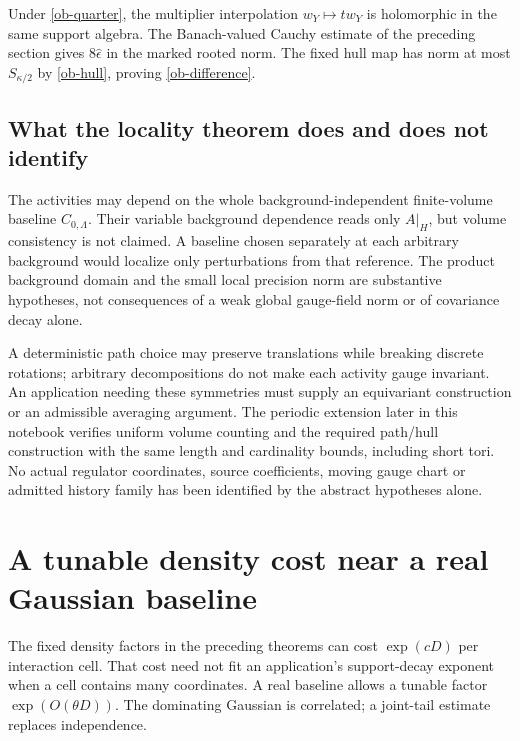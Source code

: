 \documentclass[11pt]{article}
\theoremstyle{remark}
\begin{document}
Under \eqref{ob-quarter}, the multiplier interpolation
$w_Y\mapsto tw_Y$ is holomorphic in the same support algebra.
The Banach-valued Cauchy estimate of the preceding section
gives $8\widehat\epsilon$ in the marked rooted norm.
The fixed hull map has norm at most $S_{\kappa/2}$ by
\eqref{ob-hull}, proving \eqref{ob-difference}.

\subsection{What the locality theorem does and does not identify}

The activities may depend on the whole background-independent
finite-volume baseline $C_{0,\Lambda}$. Their variable background
dependence reads only $A|_H$, but volume consistency is not
claimed. A baseline chosen separately at each arbitrary
background would localize only perturbations from that reference.
The product background domain and the small local precision
norm are substantive hypotheses, not consequences of a weak
global gauge-field norm or of covariance decay alone.

A deterministic path choice may preserve translations while
breaking discrete rotations; arbitrary decompositions do not
make each activity gauge invariant. An application needing
these symmetries must supply an equivariant construction or
an admissible averaging argument.
The periodic extension later in this notebook verifies uniform
volume counting and the required path/hull construction with the
same length and cardinality bounds, including short tori.
No actual regulator coordinates, source coefficients, moving
gauge chart or admitted history family has been identified by
the abstract hypotheses alone.


\section{A tunable density cost near a real Gaussian baseline}
\label{otg-section}

The fixed density factors in the preceding theorems can cost
$\exp(cD)$ per interaction cell. That cost need not fit an
application's support-decay exponent when a cell contains many
coordinates. A real baseline allows a tunable factor
$\exp(O(\theta D))$. The dominating Gaussian is correlated;
a joint-tail estimate replaces independence.
\end{document}
